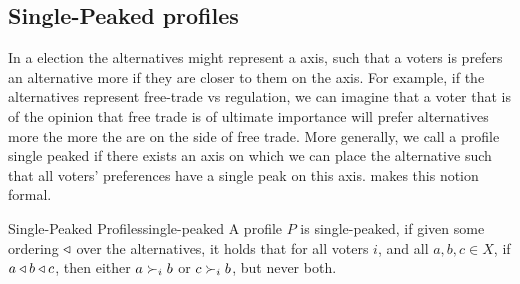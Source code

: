 \subsection{Single-Peaked profiles}
\label{sec: Single-peaked}

In a election the alternatives might represent a axis, such that a voters is prefers an alternative more if they are closer to them on the axis. For example, if the alternatives represent free-trade vs regulation, we can imagine that a voter that is of the opinion that free trade is of ultimate importance will prefer alternatives more the more the are on the side of free trade. More generally, we call a profile single peaked if there exists an axis on which we can place the alternative such that all voters' preferences have a single peak on this axis.  makes this notion formal.

\begin{definition}{Single-Peaked Profiles}{single-peaked}
	A profile $P$ is single-peaked, if given some ordering $\triangleleft$ over the alternatives, it holds that for all voters $i$, and all $a, b, c \in X$, if $a \triangleleft b \triangleleft c$, then either $a \succ_i b$ or $c \succ_i b$, but never both.
\end{definition}




